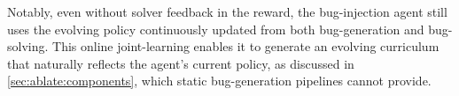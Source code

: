 Notably, even without solver feedback in the reward, the bug-injection agent still uses the evolving policy continuously updated from both bug-generation and bug-solving. This online joint-learning enables it to generate an evolving curriculum that naturally reflects the agent's current policy, as discussed in \cref{sec:ablate:components}, which static bug-generation pipelines cannot provide.

































